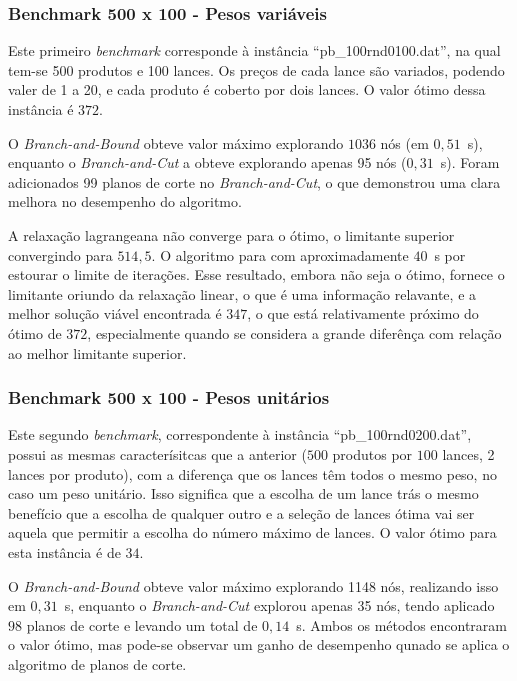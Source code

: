 \documentclass{article}
\begin{document}
    
    \subsubsection{Benchmark 500 x 100 - Pesos variáveis}%
    \label{sec:res:ssec:bchmrk1}
    
    Este primeiro \emph{benchmark} corresponde à instância \enquote{pb\_100rnd0100.dat}, na qual tem-se 500 produtos e 100 lances. Os preços de cada lance são variados, podendo valer de 1 a 20, e cada produto é coberto por dois lances. O valor ótimo dessa instância é $372$.
    
    O \emph{Branch-and-Bound} obteve valor máximo explorando $ 1036 $ nós (em $ 0{,}51 $~s), enquanto o \emph{Branch-and-Cut} a obteve explorando apenas 95 nós ($ 0{,}31 $~s). Foram adicionados 99 planos de corte no \emph{Branch-and-Cut}, o que demonstrou uma clara melhora no desempenho do algoritmo.
    
    A relaxação lagrangeana não converge para o ótimo, o limitante superior convergindo para $ 514{,}5 $. O algoritmo para com aproximadamente $40$~s por estourar o limite de iterações.  Esse resultado, embora não seja o ótimo, fornece o limitante oriundo da relaxação linear, o que é uma informação relavante, e a melhor solução viável encontrada é $347$, o que está relativamente próximo do ótimo de $372$, especialmente quando se considera a grande diferênça com relação ao melhor limitante superior.
    
    
    \subsubsection{Benchmark 500 x 100 - Pesos unitários}
    
    Este segundo \emph{benchmark}, correspondente à instância \enquote{pb\_100rnd0200.dat}, possui as mesmas caracterísitcas que a anterior ($500$ produtos por $100$ lances, 2 lances por produto), com a diferença que os lances têm todos o mesmo peso, no caso um peso unitário. Isso significa que a escolha de um lance trás o mesmo benefício que a escolha de qualquer outro e a seleção de lances ótima vai ser aquela que permitir a escolha do número máximo de lances. O valor ótimo para esta instância é de $34$.
    
    O \emph{Branch-and-Bound} obteve valor máximo explorando 1148 nós, realizando isso em $0{,}31$~s, enquanto o \emph{Branch-and-Cut} explorou apenas 35 nós, tendo aplicado $98$ planos de corte e levando um total de $0{,}14$~s. Ambos os métodos encontraram o valor ótimo, mas pode-se observar um ganho de desempenho qunado se aplica o algoritmo de planos de corte.
    
\end{document}
